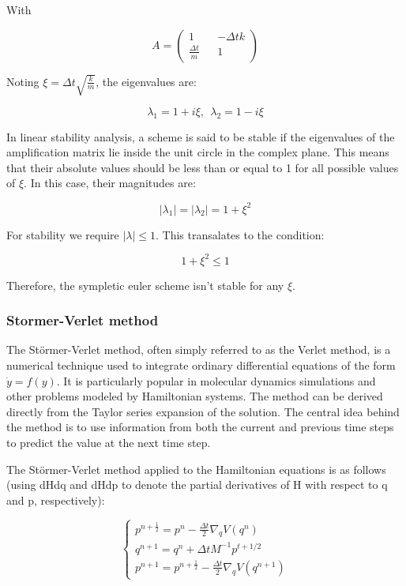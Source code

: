 \documentclass{article}
\begin{document}
With

\[
	A = \begin{pmatrix}
		1 && -\Delta t k \\
		\frac{\Delta t}{m} && 1
	\end{pmatrix}
\]

Noting \(\xi = \Delta t \sqrt{\frac{k}{m}}\), the eigenvalues are:

\[
	\lambda_1 = 1 + i\xi, \ \ \lambda_2 = 1 - i\xi
\]

In linear stability analysis, a scheme is said to be stable if the eigenvalues of the amplification matrix lie inside the unit circle in the complex plane. This means that their absolute values should be less than or equal to 1 for all possible values of \(\xi\). In this case, their magnitudes are:

\[
	|\lambda_1| = |\lambda_2| = 1 + \xi^2
\]

For stability we require \(|\lambda| \leq 1\). This transalates to the condition:

\[
	1 + \xi^2 \leq 1
\]

Therefore, the sympletic euler scheme isn't stable for any \(\xi\).




\subsubsection{Stormer-Verlet method}
\label{sec:stormer_verlet_method}

The Störmer-Verlet method, often simply referred to as the Verlet method, is a numerical technique used to integrate ordinary differential equations of the form \( \dot{y} = f(y) \). It is particularly popular in molecular dynamics simulations and other problems modeled by Hamiltonian systems. The method can be derived directly from the Taylor series expansion of the solution. The central idea behind the method is to use information from both the current and previous time steps to predict the value at the next time step. 

The Störmer-Verlet method applied to the Hamiltonian equations is as follows (using dHdq and dHdp to denote the partial derivatives of H with respect to q and p, respectively):

\begin{equation}
	\begin{cases}
		p^{n + \frac{1}{2}} = p^n - \frac{\Delta t}{2} \nabla_q V(q^n) \\
		q^{n+1} = q^{n} + \Delta t M^{-1} p^{t+1/2} \\
		p^{n+1} = p^{n+\frac{1}{2}} - \frac{\Delta t}{2} \nabla_q V(q^{n+1})
	\end{cases}
	\label{eq:stormerverlet}
\end{equation}
\end{document}
